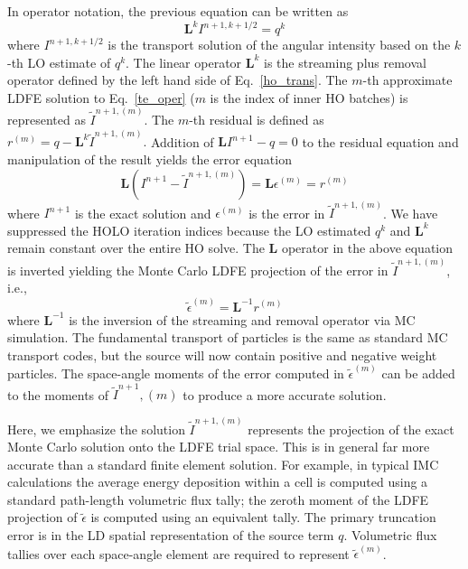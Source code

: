 \documentclass[11pt]{article}
\newcommand{\B}[1]{\ensuremath{\mathbf{#1}}}
\begin{document}
 In operator notation, the previous equation can be written as
\begin{equation}\label{te_oper}
\B L^k I^{n+1,k+1/2}  = q^{k}
\end{equation}
where $I^{n+1,k+1/2}$ is the transport solution of the angular intensity based on the
$k$-th LO estimate of $q^k$.
The linear operator $\B L^k$ is the streaming plus
removal operator defined by the left hand
side of Eq.~\eqref{ho_trans}.
The $m$-th approximate LDFE solution to Eq.~\eqref{te_oper} ($m$ is the index of inner HO
batches) is represented as
$\tilde{I}^{n+1,(m)}$.    
The $m$-th residual is defined as $r^{(m)} = q - \B L^k\tilde{I}^{n+1,(m)}.$ 
Addition of $\B L I^{n+1} - q=0$ to the residual equation 
and manipulation of the result yields the error equation
\begin{equation}
    \B L (I^{n+1} - \tilde{I}^{n+1,(m)}) = \B L {\epsilon}^{(m)} = r^{(m)}
\end{equation}
where $I^{n+1}$ is the exact solution and ${\epsilon}^{(m)}$ is the error in
$\tilde{I}^{n+1,(m)}$. 
We have suppressed the HOLO iteration indices because the LO estimated $q^{k}$ and $\B L^{k}$ remain constant over the entire HO solve.
The $\B L$ operator in the above equation is inverted yielding
the Monte Carlo LDFE projection of the error in $\tilde{I}^{n+1,(m)}$, i.e., 
\begin{equation}
\tilde{\epsilon}^{(m)} = \B L^{-1} r^{(m)}
\end{equation}
where $\B L^{-1}$ is the inversion of the streaming and removal operator via MC
simulation.  The fundamental transport of particles is the same
as standard MC transport codes, but the source will now contain positive and
negative weight particles.
 The space-angle moments of the
error computed in $\tilde{\epsilon}^{(m)}$ can be added to the moments of
$\tilde{I}^{n+1},(m)$ to produce a more accurate solution.

Here, we emphasize the solution $\tilde{I}^{n+1,(m)}$ represents the projection of the exact Monte Carlo
solution onto the LDFE trial space.  This is in general far more accurate than a standard
finite element solution.  For example, in typical IMC calculations the average energy
deposition within a cell is computed using a standard path-length volumetric flux
tally; the zeroth moment of the LDFE projection of $\tilde{\epsilon}$ is computed
using an equivalent tally.  The primary truncation error is in the LD spatial
representation of the source term $q$.  Volumetric flux tallies over
each space-angle element are required to represent $\tilde{\epsilon}^{(m)}$.  
\end{document}
